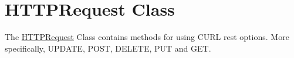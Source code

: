 \hypertarget{group__http__request__class}{}\section{H\+T\+T\+P\+Request Class}
\label{group__http__request__class}
The \hyperlink{classHTTPRequest}{H\+T\+T\+P\+Request} Class contains methods for using C\+U\+RL rest options. More specifically, U\+P\+D\+A\+TE, P\+O\+ST, D\+E\+L\+E\+TE, P\+UT and G\+ET. 